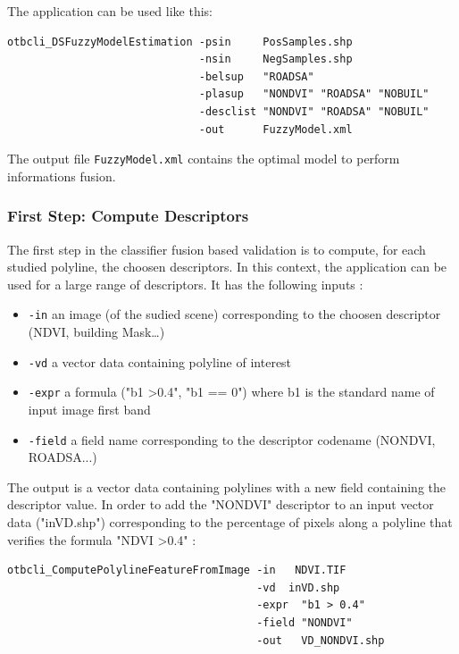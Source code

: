The application can be used like this:
\begin{verbatim}
otbcli_DSFuzzyModelEstimation -psin     PosSamples.shp
                              -nsin     NegSamples.shp
                              -belsup   "ROADSA"
                              -plasup   "NONDVI" "ROADSA" "NOBUIL"
                              -desclist "NONDVI" "ROADSA" "NOBUIL"
                              -out      FuzzyModel.xml
\end{verbatim}

The output file \verb?FuzzyModel.xml? contains the optimal model to perform
informations fusion.

\subsubsection{First Step: Compute Descriptors}

The first step in the classifier fusion based validation is to compute, for
each studied polyline, the choosen descriptors. In this context, the
 application can be used for a
large range of descriptors. It has the following inputs :
\begin{itemize}
\item \verb?-in? an image (of the sudied scene) corresponding to the choosen
descriptor (NDVI, building Mask\dots)
\item \verb?-vd? a vector data containing polyline of interest
\item \verb?-expr? a formula ("b1 \textgreater 0.4", "b1 == 0") where b1 is
the standard name of input image first band
\item \verb?-field? a field name corresponding to the descriptor codename
(NONDVI, ROADSA...)
\end{itemize}

The output is a vector data containing polylines with a new field containing
the descriptor value. In order to add the "NONDVI" descriptor to an input
vector data ("inVD.shp") corresponding to the percentage of pixels along a
polyline that verifies the formula "NDVI \textgreater 0.4" :

\begin{verbatim}
otbcli_ComputePolylineFeatureFromImage -in   NDVI.TIF
                                       -vd  inVD.shp
                                       -expr  "b1 > 0.4"
                                       -field "NONDVI"
                                       -out   VD_NONDVI.shp
\end{verbatim}

